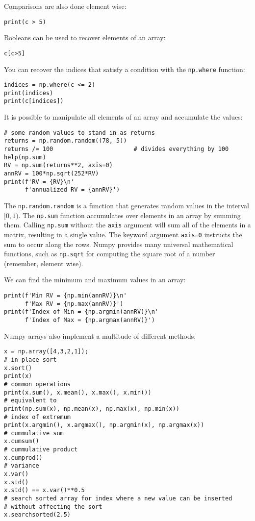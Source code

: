 \documentclass[12pt, a4paper]{article}
\begin{document}
Comparisons are also done element wise:
\lstset{language=jupyter-python,label= ,caption= ,captionpos=b,numbers=none}
\begin{lstlisting}
print(c > 5)
\end{lstlisting}
Booleans can be used to recover elements of an array:
\lstset{language=jupyter-python,label= ,caption= ,captionpos=b,numbers=none}
\begin{lstlisting}
c[c>5]
\end{lstlisting}
You can recover the indices that satisfy a condition with the \texttt{np.where} function:
\lstset{language=jupyter-python,label= ,caption= ,captionpos=b,numbers=none}
\begin{lstlisting}
indices = np.where(c <= 2)
print(indices)
print(c[indices])
\end{lstlisting}

It is possible to manipulate all elements of an array and accumulate the values:
\lstset{language=jupyter-python,label= ,caption= ,captionpos=b,numbers=none}
\begin{lstlisting}
# some random values to stand in as returns
returns = np.random.random((78, 5))
returns /= 100                       # divides everything by 100
help(np.sum)
RV = np.sum(returns**2, axis=0)
annRV = 100*np.sqrt(252*RV)
print(f'RV = {RV}\n'
      f'annualized RV = {annRV}')
\end{lstlisting}
The \texttt{np.random.random} is a function that generates random values in the interval \([0, 1)\).
The \texttt{np.sum} function accumulates over elements in an array by summing them.
Calling \texttt{np.sum} without the \texttt{axis} argument will sum all of the elements in a matrix, resulting in a single value.
The keyword argument \texttt{axis=0} instructs the sum to occur along the rows.
Numpy provides many universal mathematical functions, such as \texttt{np.sqrt} for computing the square root of a number (remember, element wise).

We can find the minimum and maximum values in an array:
\lstset{language=jupyter-python,label= ,caption= ,captionpos=b,numbers=none}
\begin{lstlisting}
print(f'Min RV = {np.min(annRV)}\n'
      f'Max RV = {np.max(annRV)}')
print(f'Index of Min = {np.argmin(annRV)}\n'
      f'Index of Max = {np.argmax(annRV)}')
\end{lstlisting}

Numpy arrays also implement a multitude of different methods:
\lstset{language=jupyter-python,label= ,caption= ,captionpos=b,numbers=none}
\begin{lstlisting}
x = np.array([4,3,2,1]);
# in-place sort
x.sort()
print(x)
# common operations
print(x.sum(), x.mean(), x.max(), x.min())
# equivalent to
print(np.sum(x), np.mean(x), np.max(x), np.min(x))
# index of extremum
print(x.argmin(), x.argmax(), np.argmin(x), np.argmax(x))
# cummulative sum
x.cumsum()
# cummulative product
x.cumprod()
# variance
x.var()
x.std()
x.std() == x.var()**0.5
# search sorted array for index where a new value can be inserted
# without affecting the sort
x.searchsorted(2.5)
\end{lstlisting}
\end{document}
